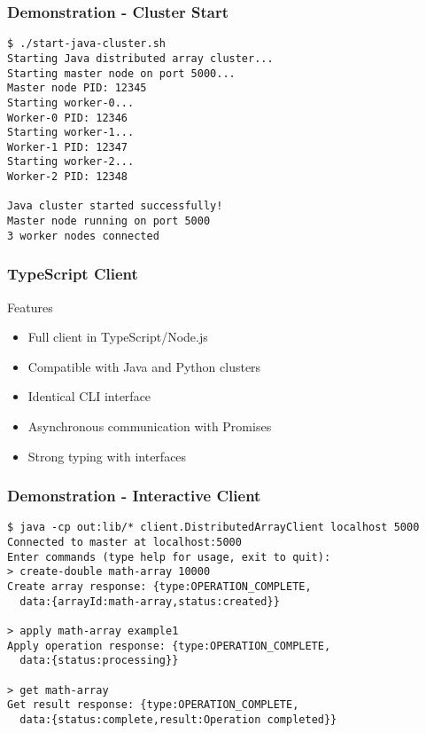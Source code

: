 \documentclass{beamer}
\begin{document}
\begin{frame}[fragile]
\frametitle{Demonstration - Cluster Start}
\begin{lstlisting}[style=terminal]
$ ./start-java-cluster.sh
Starting Java distributed array cluster...
Starting master node on port 5000...
Master node PID: 12345
Starting worker-0...
Worker-0 PID: 12346
Starting worker-1...
Worker-1 PID: 12347
Starting worker-2...
Worker-2 PID: 12348

Java cluster started successfully!
Master node running on port 5000
3 worker nodes connected
\end{lstlisting}
\end{frame}

\begin{frame}[fragile]
\frametitle{TypeScript Client}
\begin{block}{Features}
    \begin{itemize}
        \item<1-> Full client in TypeScript/Node.js
        \item<2-> Compatible with Java and Python clusters
        \item<3-> Identical CLI interface
        \item<4-> Asynchronous communication with Promises
        \item<5-> Strong typing with interfaces
    \end{itemize}
\end{block}

\end{frame}

\begin{frame}[fragile]
\frametitle{Demonstration - Interactive Client}
\begin{lstlisting}[style=terminal]
$ java -cp out:lib/* client.DistributedArrayClient localhost 5000
Connected to master at localhost:5000
Enter commands (type help for usage, exit to quit):
> create-double math-array 10000
Create array response: {type:OPERATION_COMPLETE,
  data:{arrayId:math-array,status:created}}

> apply math-array example1
Apply operation response: {type:OPERATION_COMPLETE,
  data:{status:processing}}

> get math-array
Get result response: {type:OPERATION_COMPLETE,
  data:{status:complete,result:Operation completed}}
\end{lstlisting}
\end{frame}
\end{document}
